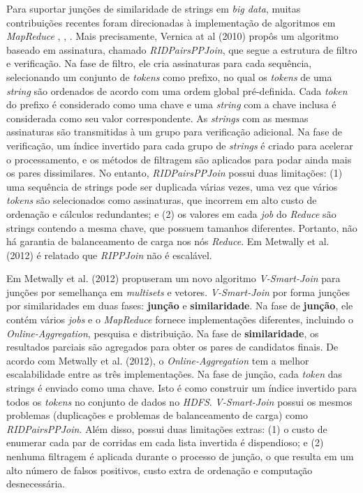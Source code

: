 Para suportar junções de similaridade de strings em \textit{big data}, muitas contribuições recentes foram direcionadas à implementação de algoritmos em \textit{MapReduce} \cite{Vernica:2010:EPS:1807167.1807222}, \cite{Metwally:2012}, \cite{Deng:2014}. Mais precisamente, Vernica at al (2010) \cite{Vernica:2010:EPS:1807167.1807222} propôs um algoritmo baseado em assinatura, chamado \textit{RIDPairsPPJoin}, que segue a estrutura de filtro e verificação. Na fase de filtro, ele cria assinaturas para cada sequência, selecionando um conjunto de \textit{tokens} como prefixo, no qual os \textit{tokens} de uma \textit{string} são ordenados de acordo com uma ordem global pré-definida. Cada \textit{token} do prefixo é considerado como uma chave e uma \textit{string} com a chave inclusa é considerada como seu valor correspondente. As \textit{strings} com as mesmas assinaturas são transmitidas à um grupo para verificação adicional. Na fase de verificação, um índice invertido para cada grupo de \textit{strings} é criado para acelerar o processamento, e os métodos de filtragem são aplicados para podar ainda mais os pares dissimilares. No entanto, \textit{RIDPairsPPJoin} possui duas limitações: 
(1) uma sequência de strings pode ser duplicada várias vezes, uma vez que vários \textit{tokens} são selecionados como assinaturas, que incorrem em alto custo de ordenação e cálculos redundantes; e (2) os valores em cada \textit{job} do \textit{Reduce} são strings contendo a mesma chave, que possuem tamanhos diferentes. Portanto, não há garantia de balanceamento de carga nos nós \textit{Reduce}. Em Metwally et al. (2012)\cite{Metwally:2012} é relatado que \textit{RIPPJoin} não é escalável.

Em Metwally et al. (2012)\cite{Metwally:2012} propuseram um novo algoritmo \textit{V-Smart-Join} para junções por semelhança em \textit{multisets} e vetores. \textit{V-Smart-Join} por forma junções por similaridades em duas fases: \textbf{junção} e \textbf{similaridade}. Na fase de \textbf{junção}, ele contém vários \textit{jobs} e o \textit{MapReduce} fornece implementações diferentes, incluindo o \textit{Online-Aggregation}, pesquisa e distribuição. Na fase de \textbf{similaridade}, os resultados parciais são agregados para obter os pares de candidatos finais. De acordo com Metwally et al. (2012)\cite{Metwally:2012}, o \textit{Online-Aggregation} tem a melhor escalabilidade entre as três implementações. Na fase de junção, cada \textit{token} das strings é enviado como uma chave. Isto é como construir um índice invertido para todos os \textit{tokens} no conjunto de dados no \textit{HDFS}. \textit{V-Smart-Join} possui os mesmos problemas (duplicações e problemas de balanceamento de carga) como \textit{RIDPairsPPJoin}. Além disso, possui duas limitações extras: (1) o custo de enumerar cada par de corridas em cada lista invertida é dispendioso; e (2) nenhuma filtragem é aplicada durante o processo de junção, o que resulta em um alto número de falsos positivos, custo extra de ordenação e computação desnecessária.

